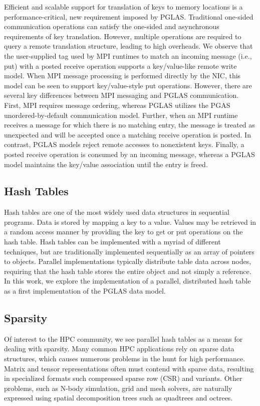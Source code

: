 Efficient and scalable support for translation of keys to memory locations is a
performance-critical, new requirement imposed by PGLAS.  Traditional one-sided
communication operations can satisfy the one-sided and asynchronous
requirements of key translation.  However, multiple operations are required to
query a remote translation structure, leading to high overheads.  We observe
that the user-supplied tag used by MPI runtimes to match an incoming message
(i.e., put) with a posted receive operation supports a key/value-like remote
write model.  When MPI message processing is performed directly by the NIC,
this model can be seen to support key/value-style put operations.  However,
there are several key differences between MPI messaging and PGLAS
communication.  First, MPI requires message ordering, whereas PGLAS utilizes
the PGAS unordered-by-default communication model.  Further, when an MPI
runtime receives a message for which there is no matching entry, the message is
treated as unexpected and will be accepted once a matching receive operation is
posted.  In contrast, PGLAS models reject remote accesses to nonexistent keys.
Finally, a posted receive operation is consumed by an incoming message, whereas
a PGLAS model maintains the key/value association until the entry is freed.

\subsection{Hash Tables}

Hash tables are one of the most widely used data
structures in sequential programs. Data is stored by mapping a key to
a value. Values may be retrieved in a random access manner by
providing the key to get or put operations on the hash table.
%
Hash tables can be implemented with a myriad of different techniques,
but are traditionally implemented sequentially as an array of pointers
to objects. Parallel implementations typically distribute table data
across nodes, requiring that the hash table stores the entire object
and not simply a reference.
%
In this work, we explore the implementation of a parallel, distributed hash
table as a first implementation of the PGLAS data model.

\subsection{Sparsity}
Of interest to the HPC community, we see parallel hash tables as a
means for dealing with sparsity. Many common HPC applications rely on
sparse data structures, which causes numerous problems in the hunt for
high performance. Matrix and tensor representations often must contend
with sparse data, resulting in specialized formats such compressed
sparse row (CSR) and variants. Other problems, such as N-body
simulation, grid and mesh solvers, are naturally expressed using
spatial decomposition trees such as quadtrees and octrees. 

